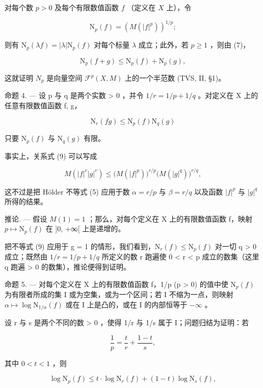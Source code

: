 对每个数 \(p > 0\) 及每个有限数值函数 \(f\) （定义在 \(X\) 上），令

\[
\mathrm{N} _ {p} (f) = \left(M (| f | ^ {p})\right) ^ {1 / p};
\]

则有 \(\mathrm{N}_p(\lambda f) = |\lambda |\mathrm{N}_p(f)\) 对每个标量 \(\lambda\) 成立；此外，若 \(p \geqslant 1\) ，则由 (7)，

\[
\mathrm{N} _ {p} (f + g) \leqslant \mathrm{N} _ {p} (f) + \mathrm{N} _ {p} (g),\tag{8}
\]

这就证明 \(N_{p}\) 是向量空间 \(\mathcal{F}^{p}(X,M)\) 上的一个半范数 (TVS, II, §1)。

命题 4. --- 设 p 与 q 是两个实数 \textgreater{} 0 ，并令 \(1/r = 1/p + 1/q\) 。对定义在 X 上的任意有限数值函数 f, g，

\[
\mathrm{N} _ {r} (f g) \leqslant \mathrm{N} _ {p} (f) \mathrm{N} _ {q} (g)\tag{9}
\]

只要 \(\mathrm{N}_p(f)\) 与 \(\mathrm{N}_q(g)\) 有限。

事实上，关系式 (9) 可以写成

\[
M (| f | ^ {r} | g | ^ {r}) \leqslant \bigl (M (| f | ^ {p}) \bigr) ^ {r / p} \bigl (M (| g | ^ {q}) \bigr) ^ {r / q},
\]

这不过是把 Hölder 不等式 (5) 应用于数 \(\alpha = r / p\) 与 \(\beta = r / q\) 以及函数 \(|f|^p\) 与 \(|g|^q\) 所得的结果。

推论. --- 假设 \(M(1) = 1\) ；那么，对每个定义在 X 上的有限数值函数 f，映射 \(p \mapsto \mathrm{N}_{p}(f)\) 在 {]}0, +∞{[} 上是递增的。

把不等式 (9) 应用于 g = 1 的情形，我们看到，\(\mathrm{N}_{r}(f) \leqslant \mathrm{N}_{p}(f)\) 对一切 q \textgreater{} 0 成立；既然由 \(1/r = 1/p + 1/q\) 所定义的数 r 跑遍使 0 < r < p 成立的数集（这里 q 跑遍 \textgreater{} 0 的数集），推论便得到证明。

命题 5. --- 对每个定义在 X 上的有限数值函数 f，1/p (p \textgreater{} 0) 的值中使 \(\mathrm{N}_{p}(f)\) 为有限者所成的集 I 或为空集，或为一个区间；若 I 不缩为一点，则映射 \(\alpha \mapsto \log \mathrm{N}_{1/\alpha}(f)\) 或在 I 上是凸的，或在 I 的内部恒等于 \(-\infty\) 。

设 r 与 s 是两个不同的数 \textgreater{} 0 ，使得 1/r 与 1/s 属于 I；问题归结为证明：若

\[
{\frac {1}{p}} = {\frac {t}{r}} + {\frac {1 - t}{s}},
\]

其中 \(0 < t < 1\) ，则

\[
\log \mathrm{N} _ {p} (f) \leqslant t \cdot \log \mathrm{N} _ {r} (f) + (1 - t) \log \mathrm{N} _ {s} (f),\tag{10}
\]

